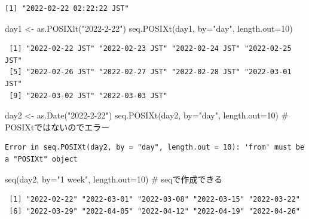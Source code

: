 \documentclass[
  letterpaper,
  DIV=11,
  numbers=noendperiod]{scrreprt}
\newenvironment{Shaded}{\begin{snugshade}}{\end{snugshade}}
\newcommand{\AttributeTok}[1]{\textcolor[rgb]{0.40,0.45,0.13}{#1}}
\newcommand{\CommentTok}[1]{\textcolor[rgb]{0.37,0.37,0.37}{#1}}
\newcommand{\DecValTok}[1]{\textcolor[rgb]{0.68,0.00,0.00}{#1}}
\newcommand{\FunctionTok}[1]{\textcolor[rgb]{0.28,0.35,0.67}{#1}}
\newcommand{\NormalTok}[1]{\textcolor[rgb]{0.00,0.23,0.31}{#1}}
\newcommand{\OtherTok}[1]{\textcolor[rgb]{0.00,0.23,0.31}{#1}}
\newcommand{\StringTok}[1]{\textcolor[rgb]{0.13,0.47,0.30}{#1}}
\begin{document}
\begin{verbatim}
[1] "2022-02-22 02:22:22 JST"
\end{verbatim}

\begin{Shaded}
\begin{Highlighting}[]
\NormalTok{day1 }\OtherTok{\textless{}{-}} \FunctionTok{as.POSIXlt}\NormalTok{(}\StringTok{"2022{-}2{-}22"}\NormalTok{)}
\FunctionTok{seq.POSIXt}\NormalTok{(day1, }\AttributeTok{by=}\StringTok{"day"}\NormalTok{, }\AttributeTok{length.out=}\DecValTok{10}\NormalTok{) }
\end{Highlighting}
\end{Shaded}

\begin{verbatim}
 [1] "2022-02-22 JST" "2022-02-23 JST" "2022-02-24 JST" "2022-02-25 JST"
 [5] "2022-02-26 JST" "2022-02-27 JST" "2022-02-28 JST" "2022-03-01 JST"
 [9] "2022-03-02 JST" "2022-03-03 JST"
\end{verbatim}

\begin{Shaded}
\begin{Highlighting}[]
\NormalTok{day2 }\OtherTok{\textless{}{-}} \FunctionTok{as.Date}\NormalTok{(}\StringTok{"2022{-}2{-}22"}\NormalTok{)}
\FunctionTok{seq.POSIXt}\NormalTok{(day2, }\AttributeTok{by=}\StringTok{"day"}\NormalTok{, }\AttributeTok{length.out=}\DecValTok{10}\NormalTok{) }\CommentTok{\# POSIXtではないのでエラー}
\end{Highlighting}
\end{Shaded}

\begin{verbatim}
Error in seq.POSIXt(day2, by = "day", length.out = 10): 'from' must be a "POSIXt" object
\end{verbatim}

\begin{Shaded}
\begin{Highlighting}[]
\FunctionTok{seq}\NormalTok{(day2, }\AttributeTok{by=}\StringTok{"1 week"}\NormalTok{, }\AttributeTok{length.out=}\DecValTok{10}\NormalTok{) }\CommentTok{\# seqで作成できる}
\end{Highlighting}
\end{Shaded}

\begin{verbatim}
 [1] "2022-02-22" "2022-03-01" "2022-03-08" "2022-03-15" "2022-03-22"
 [6] "2022-03-29" "2022-04-05" "2022-04-12" "2022-04-19" "2022-04-26"
\end{verbatim}
\end{document}
